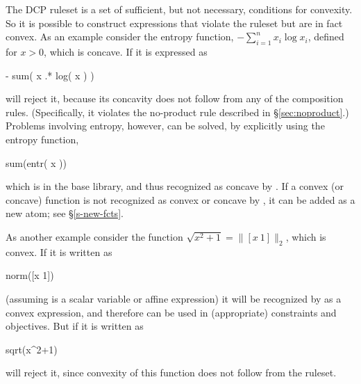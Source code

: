 \documentclass[12pt]{article}
\begin{document}
The DCP ruleset is a set of sufficient, but not necessary, conditions
for convexity.  So it is possible to construct expressions that violate
the ruleset but are in fact convex. 
As an example consider the entropy function,
$-\sum_{i=1}^n  x_i \log x_i$,
defined for $x>0$, which is concave.
If it is expressed as
\begin{code}
	- sum( x .* log( x ) )
\end{code}
\cvx will reject it, because its concavity does not 
follow from any of the composition rules.
(Specifically, it violates the 
no-product rule described in \S\ref{sec:noproduct}.)
Problems involving entropy, however, can be solved, by explicitly
using the entropy function, 
\begin{code}
	sum(entr( x ))
\end{code}
which is in the base \cvx library, and thus recognized as 
concave by \cvx.
If a convex (or concave) function is not recognized as
convex or concave by \cvx, it can be added as a new atom;
see \S\ref{s-new-fcts}.

As another example consider the function $\sqrt{x^2+1}=\|[x~1]\|_2$,
which is convex.
If it is written as
\begin{code}
	norm([x 1])
\end{code}
(assuming \verb@x@ is a scalar variable or affine expression)
it will be recognized by \cvx as a convex expression, and therefore 
can be used in (appropriate) constraints and objectives.
But if it is written as
\begin{code}
	sqrt(x^2+1)
\end{code}
\cvx will reject it, since convexity of this function does not follow
from the \cvx ruleset.



\end{document}
